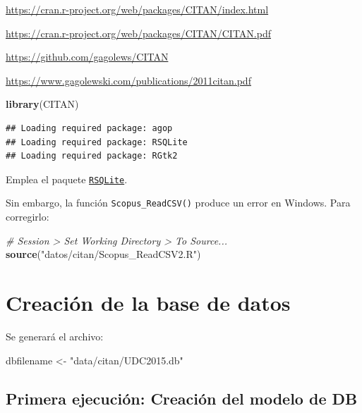 \documentclass[
]{book}
\newenvironment{Shaded}{\begin{snugshade}}{\end{snugshade}}
\newcommand{\CommentTok}[1]{\textcolor[rgb]{0.56,0.35,0.01}{\textit{#1}}}
\newcommand{\FunctionTok}[1]{\textcolor[rgb]{0.13,0.29,0.53}{\textbf{#1}}}
\newcommand{\NormalTok}[1]{#1}
\newcommand{\OtherTok}[1]{\textcolor[rgb]{0.56,0.35,0.01}{#1}}
\newcommand{\StringTok}[1]{\textcolor[rgb]{0.31,0.60,0.02}{#1}}
\begin{document}
\url{https://cran.r-project.org/web/packages/CITAN/index.html}

\url{https://cran.r-project.org/web/packages/CITAN/CITAN.pdf}

\url{https://github.com/gagolews/CITAN}

\url{https://www.gagolewski.com/publications/2011citan.pdf}

\begin{Shaded}
\begin{Highlighting}[]
\FunctionTok{library}\NormalTok{(CITAN)}
\end{Highlighting}
\end{Shaded}

\begin{verbatim}
## Loading required package: agop
## Loading required package: RSQLite
## Loading required package: RGtk2
\end{verbatim}

Emplea el paquete \href{https://r-dbi.github.io/RSQLite}{\texttt{RSQLite}}.

Sin embargo, la función \texttt{Scopus\_ReadCSV()} produce un error en Windows. Para corregirlo:

\begin{Shaded}
\begin{Highlighting}[]
\CommentTok{\# Session \textgreater{} Set Working Directory \textgreater{} To Source...}
\FunctionTok{source}\NormalTok{(}\StringTok{"datos/citan/Scopus\_ReadCSV2.R"}\NormalTok{)}
\end{Highlighting}
\end{Shaded}

\hypertarget{creaciuxf3n-de-la-base-de-datos}{%
\section{Creación de la base de datos}\label{creaciuxf3n-de-la-base-de-datos}}

Se generará el archivo:

\begin{Shaded}
\begin{Highlighting}[]
\NormalTok{dbfilename }\OtherTok{\textless{}{-}} \StringTok{"data/citan/UDC2015.db"}
\end{Highlighting}
\end{Shaded}

\hypertarget{primera-ejecuciuxf3n-creaciuxf3n-del-modelo-de-db}{%
\subsection{Primera ejecución: Creación del modelo de DB}\label{primera-ejecuciuxf3n-creaciuxf3n-del-modelo-de-db}}
\end{document}

